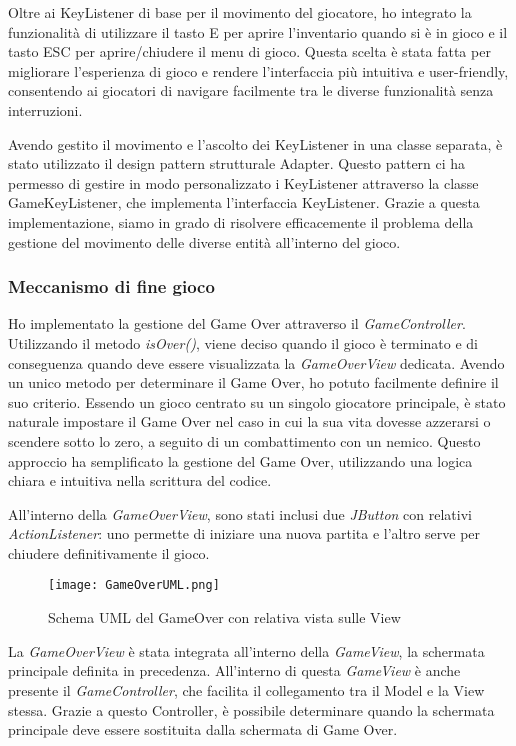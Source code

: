 \documentclass[a4paper,12pt]{report}
\begin{document}
Oltre ai KeyListener di base per il movimento del giocatore, ho integrato la funzionalità di utilizzare il tasto E per aprire l'inventario quando si è in gioco e il tasto ESC per aprire/chiudere il menu di gioco. Questa scelta è stata fatta per migliorare l'esperienza di gioco e rendere l'interfaccia più intuitiva e user-friendly, consentendo ai giocatori di navigare facilmente tra le diverse funzionalità senza interruzioni.

Avendo gestito il movimento e l'ascolto dei KeyListener in una classe separata, è stato utilizzato il design pattern strutturale Adapter. Questo pattern ci ha permesso di gestire in modo personalizzato i KeyListener attraverso la classe GameKeyListener, che implementa l'interfaccia KeyListener. Grazie a questa implementazione, siamo in grado di risolvere efficacemente il problema della gestione del movimento delle diverse entità all'interno del gioco.

\subsubsection{Meccanismo di fine gioco}
Ho implementato la gestione del Game Over attraverso il \textit{GameController}. Utilizzando il metodo \textit{isOver()}, viene deciso quando il gioco è terminato e di conseguenza quando deve essere visualizzata la \textit{GameOverView} dedicata. Avendo un unico metodo per determinare il Game Over, ho potuto facilmente definire il suo criterio. Essendo un gioco centrato su un singolo giocatore principale, è stato naturale impostare il Game Over nel caso in cui la sua vita dovesse azzerarsi o scendere sotto lo zero, a seguito di un combattimento con un nemico. Questo approccio ha semplificato la gestione del Game Over, utilizzando una logica chiara e intuitiva nella scrittura del codice.

All'interno della \textit{GameOverView}, sono stati inclusi due \textit{JButton} con relativi \textit{ActionListener}: uno permette di iniziare una nuova partita e l'altro serve per chiudere definitivamente il gioco.

\begin{figure}[H]
	\centering
	\texttt{[image: GameOverUML.png]}
	\caption{Schema UML del GameOver con relativa vista sulle View}
	\label{fig:diagramma-classe-GameOver}
\end{figure}

La \textit{GameOverView} è stata integrata all'interno della \textit{GameView}, la schermata principale definita in precedenza. All'interno di questa \textit{GameView} è anche presente il \textit{GameController}, che facilita il collegamento tra il Model e la View stessa. Grazie a questo Controller, è possibile determinare quando la schermata principale deve essere sostituita dalla schermata di Game Over.
\end{document}
